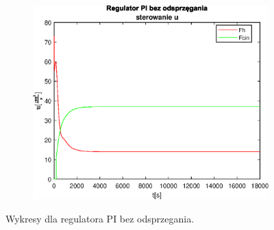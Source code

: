 \begin{figure}[h!]
   \begin{subfigure}[b]{0.4\textwidth}
      \includegraphics[width=1\linewidth]{img/PI/noDecoupler/noDisturbance/PINoDecouplerControl0.eps}
      \caption{}
      \label{fig:fig:PINodDecoupler03}
   \end{subfigure}
       
   \caption{Wykresy dla regulatora PI bez odsprzegania.}
   \label{fig:PINodDecoupler0}
\end{figure}
           

